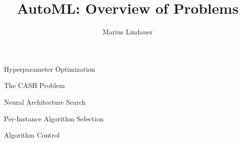 




\title[AutoML: Problem]{AutoML: Overview of Problems}
\author{Marius Lindauer}
\date{}





	
	\maketitle
	


\begin{frame}[c]{Hyperparameter Optimization}


\end{frame}
\begin{frame}[c]{The CASH Problem}


\end{frame}
\begin{frame}[c]{Neural Architecture Search}


\end{frame}
\begin{frame}[c]{Per-Instance Algorithm Selection}


\end{frame}
\begin{frame}[c]{Algorithm Control}


\end{frame}


